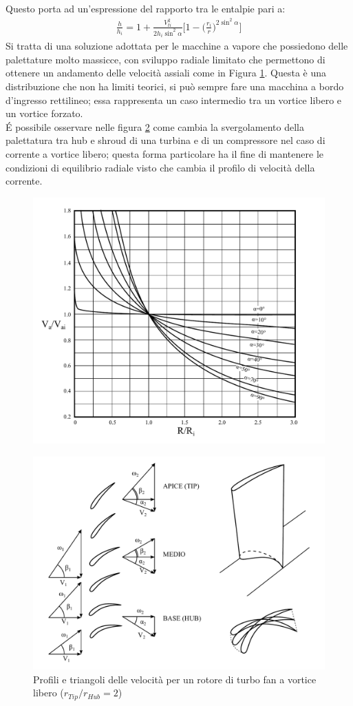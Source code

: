 Questo porta ad un'espressione del rapporto tra le entalpie pari a:
\begin{align*}
\boxed{ \frac{h}{h_i} =  1+ \frac{V_{ti}^2}{2 h_i \sin^2 \alpha} \bigg[1- \bigg(\frac{r_i}{r} \bigg) ^{2 \sin^2 \alpha} \bigg]}
\end{align*}
Si tratta di una soluzione adottata per le macchine a vapore che possiedono delle palettature molto massicce, con sviluppo radiale limitato che permettono di ottenere un andamento delle velocità assiali come in Figura \ref{fig:AngPalCost}. Questa è una distribuzione che non ha limiti teorici, si può sempre fare una macchina a bordo d'ingresso rettilineo; essa rappresenta un caso intermedio tra un vortice libero e un vortice forzato.\\
\'E possibile osservare nelle figura \ref{fig:TurboFan1} come cambia la svergolamento della palettatura tra hub e shroud di una turbina e di un compressore nel caso di corrente a vortice libero; questa forma particolare ha il fine di mantenere le condizioni di equilibrio radiale visto che cambia il profilo di velocità della corrente.
\begin{figure}
\centering
  \includegraphics[width=.8\textwidth]{fig/AngPalCost.pdf}
\caption{}
\label{fig:AngPalCost}
\end{figure}
\begin{figure}
\centering
  \includegraphics[width=.8\textwidth]{fig/TurboFan.pdf}
\caption{Profili e triangoli delle velocità per un rotore di turbo fan a vortice libero ($r_{Tip}/r_{Hub} =2$)}
\label{fig:TurboFan1}
\end{figure}
